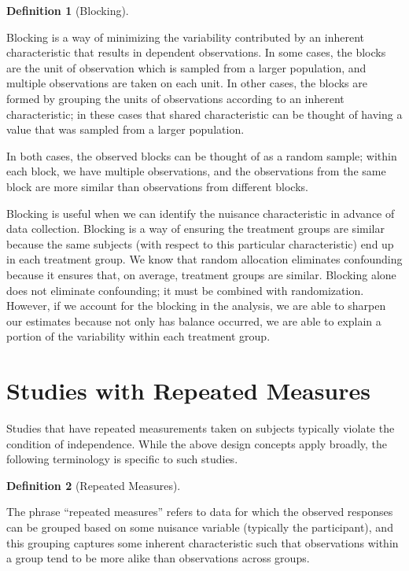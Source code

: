\documentclass[
  letterpaper,
  DIV=11,
  numbers=noendperiod]{scrreprt}
\theoremstyle{definition}
\newtheorem{definition}{Definition}[chapter]
\theoremstyle{definition}
\theoremstyle{remark}
\begin{document}
\begin{definition}[Blocking]\protect\hypertarget{def-blocking}{}\label{def-blocking}

Blocking is a way of minimizing the variability contributed by an
inherent characteristic that results in dependent observations. In some
cases, the blocks are the unit of observation which is sampled from a
larger population, and multiple observations are taken on each unit. In
other cases, the blocks are formed by grouping the units of observations
according to an inherent characteristic; in these cases that shared
characteristic can be thought of having a value that was sampled from a
larger population.

In both cases, the observed blocks can be thought of as a random sample;
within each block, we have multiple observations, and the observations
from the same block are more similar than observations from different
blocks.

\end{definition}

Blocking is useful when we can identify the nuisance characteristic in
advance of data collection. Blocking is a way of ensuring the treatment
groups are similar because the same subjects (with respect to this
particular characteristic) end up in each treatment group. We know that
random allocation eliminates confounding because it ensures that, on
average, treatment groups are similar. Blocking alone does not eliminate
confounding; it must be combined with randomization. However, if we
account for the blocking in the analysis, we are able to sharpen our
estimates because not only has balance occurred, we are able to explain
a portion of the variability within each treatment group.

\hypertarget{studies-with-repeated-measures}{%
\section{Studies with Repeated
Measures}\label{studies-with-repeated-measures}}

Studies that have repeated measurements taken on subjects typically
violate the condition of independence. While the above design concepts
apply broadly, the following terminology is specific to such studies.

\begin{definition}[Repeated
Measures]\protect\hypertarget{def-repeated-measures}{}\label{def-repeated-measures}

The phrase ``repeated measures'' refers to data for which the observed
responses can be grouped based on some nuisance variable (typically the
participant), and this grouping captures some inherent characteristic
such that observations within a group tend to be more alike than
observations across groups.

\end{definition}
\end{document}
